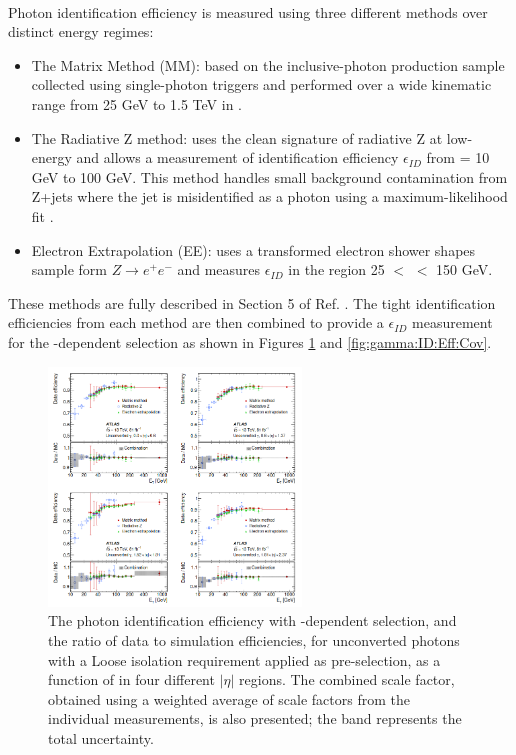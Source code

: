 \\
Photon identification efficiency is measured using three different methods over distinct energy regimes:
\begin{itemize}
\item The Matrix Method (MM): based on the inclusive-photon production sample collected using single-photon triggers and performed over a wide kinematic range from 25 GeV to 1.5 TeV in \eT. 
\item The Radiative Z method: uses the clean signature of radiative Z at low-energy and allows a measurement of identification efficiency $\epsilon_{ID}$ from \eT = 10 GeV to 100 GeV. This method handles small background contamination from Z+jets where the jet is misidentified as a photon using a maximum-likelihood fit \cite{Photon_Eff_Run1}. 
\item Electron Extrapolation (EE): uses a transformed electron shower shapes sample form $Z\rightarrow e^+e^-$ and measures $\epsilon_{ID}$ in the region 25 $<$ \eT $<$ 150 GeV.
\end{itemize}
These methods are fully described in Section 5 of Ref. \cite{Photon_Eff_2015}. The tight identification efficiencies from each method are then combined to provide a $\epsilon_{ID}$ measurement for the \eT-dependent selection as shown in Figures \ref{fig:gamma:ID:Eff:UnCov} and \ref{fig:gamma:ID:Eff:Cov}. 
\begin{figure}[htbp]
    \centering
    \includegraphics[width=0.6\textwidth]{Ch3/Img/Unconverted_Eff_2017.png}
    \caption{The photon identification efficiency with \eT-dependent selection, and the ratio of data to simulation efficiencies, for unconverted photons with a Loose isolation requirement applied as pre-selection, as a function of \eT in four different $|\eta|$ regions. The combined scale factor, obtained using a weighted average of scale factors from the individual measurements, is also presented; the band represents the total uncertainty.}
    \label{fig:gamma:ID:Eff:UnCov}
\end{figure}

